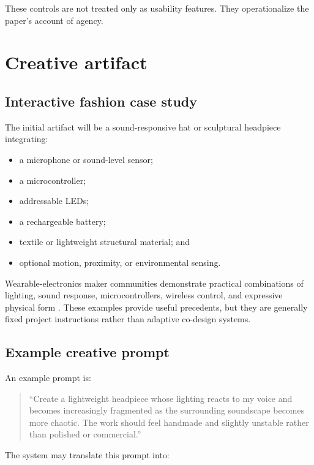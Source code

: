 \documentclass{article}
\begin{document}
These controls are not treated only as usability features. They operationalize
the paper's account of agency.

\section{Creative artifact}

\subsection{Interactive fashion case study}

The initial artifact will be a sound-responsive hat or sculptural headpiece
integrating:

\begin{itemize}[leftmargin=*]
    \item a microphone or sound-level sensor;
    \item a microcontroller;
    \item addressable LEDs;
    \item a rechargeable battery;
    \item textile or lightweight structural material; and
    \item optional motion, proximity, or environmental sensing.
\end{itemize}

Wearable-electronics maker communities demonstrate practical combinations of
lighting, sound response, microcontrollers, wireless control, and expressive
physical form \citep{adafruitwearables}. These examples provide useful
precedents, but they are generally fixed project instructions rather than
adaptive co-design systems.

\subsection{Example creative prompt}

An example prompt is:

\begin{quote}
``Create a lightweight headpiece whose lighting reacts to my voice and becomes
increasingly fragmented as the surrounding soundscape becomes more chaotic. The
work should feel handmade and slightly unstable rather than polished or
commercial.''
\end{quote}

The system may translate this prompt into:
\end{document}
